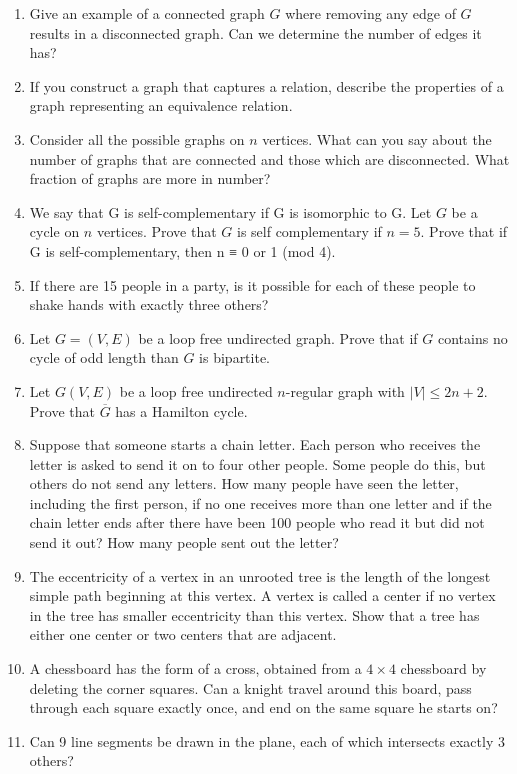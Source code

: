 \documentclass[a4paper]{article}
\begin{document}
\begin{enumerate}
\item Give an example of a connected graph $G$ where removing any edge of $G$ results in a disconnected graph. Can we determine the number of edges it has?

\item If you construct a graph that captures a relation, describe the properties of a graph representing an equivalence relation.

\item Consider all the possible graphs on $n$ vertices. What can you say about the number of graphs that are connected and those which are disconnected. What fraction of graphs are more in number?

\item We say that G is self-complementary if G is isomorphic to
G. Let $G$ be a cycle on  $n$ vertices. Prove that $G$ is self complementary if $n=5$. Prove that if G is self-complementary, then n ≡ 0 or 1 (mod 4).

\item If there are 15 people in a party, is it possible for each of these people to shake hands with exactly three others?

\item Let $G=(V,E)$ be a loop free undirected graph. Prove that if $G$ contains no cycle of odd length than $G$ is bipartite. 

\item Let $G(V,E)$ be a loop free undirected $n$-regular graph with 
$|V| \leq 2n +2$. Prove that $\overline{G}$ has a Hamilton cycle. 


\item Suppose that someone starts a chain letter. Each person who receives the letter is asked to send
it on to four other people. Some people do this, but others do not send any letters. How many
people have seen the letter, including the first person, if no one receives more than one letter
and if the chain letter ends after there have been 100 people who read it but did not send it out?
How many people sent out the letter?


\item The eccentricity of a vertex in an unrooted tree is the length
of the longest simple path beginning at this vertex. A vertex is
called a center if no vertex in the tree has smaller eccentricity
than this vertex. Show that a tree has either one center or two centers that
are adjacent. 

\item A chessboard has the form of a cross, obtained from a $4 \times 4$ chessboard by deleting the corner squares. Can a knight travel around this
board, pass through each square exactly once, and end on the same square he
starts on?

\item  Can 9 line segments be drawn in the plane, each of which intersects
exactly 3 others?


\end{enumerate}
\end{document}
